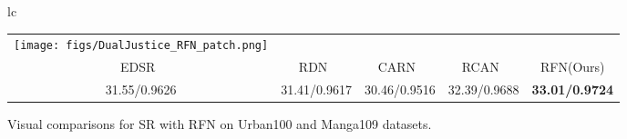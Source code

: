 \documentclass[preprint]{elsarticle}
\begin{document}
\begin{figure*}[htpb]
{\begin{tabular}{lc}
\begin{adjustbox}{valign=t}
\begin{tabular}{ccccc}
				\hspace{-3mm}
				\texttt{[image: figs/DualJustice\_RFN\_patch.png]} \\
				EDSR~\cite{EDSR} & \hspace{-3mm} RDN~\cite{RDN} & \hspace{-3mm} CARN~\cite{CARN} & \hspace{-3mm} RCAN~\cite{RCAN} & \hspace{-3mm} RFN(Ours) \\
				31.55/0.9626 & \hspace{-3mm} 31.41/0.9617 & \hspace{-3mm} 30.46/0.9516 & \hspace{-3mm} 32.39/0.9688 & \hspace{-3mm} \textbf{33.01/0.9724} \\
			\end{tabular}
		\end{adjustbox}
	\end{tabular} }
	\caption{Visual comparisons for  SR with RFN on Urban100 and Manga109 datasets.}
	\label{fig:compare-PSNR}
\end{figure*}
\end{document}
